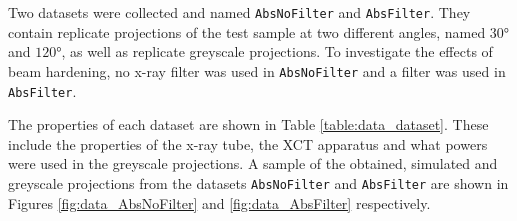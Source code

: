 Two datasets were collected and named \texttt{AbsNoFilter} and \texttt{AbsFilter}. They contain replicate projections of the test sample at two different angles, named $\ang{30}$ and $\ang{120}$, as well as replicate greyscale projections. To investigate the effects of beam hardening, no x-ray filter was used in \texttt{AbsNoFilter} and a filter was used in \texttt{AbsFilter}.

The properties of each dataset are shown in Table \ref{table:data_dataset}. These include the properties of the x-ray tube, the XCT apparatus and what powers were used in the greyscale projections. A sample of the obtained, simulated and greyscale projections from the datasets \texttt{AbsNoFilter} and \texttt{AbsFilter} are shown in Figures \ref{fig:data_AbsNoFilter} and \ref{fig:data_AbsFilter} respectively.

